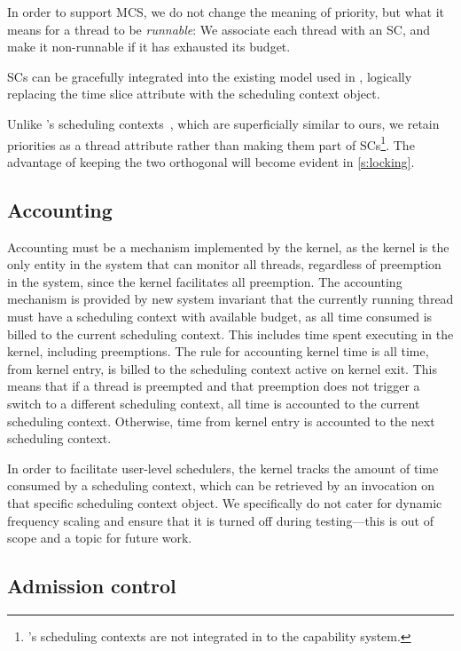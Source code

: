 In order to support MCS, we do not
change the meaning of priority, but what it means for a thread to be
\emph{runnable}: We associate each thread with an SC, and
make it non-runnable if it has exhausted its budget. 


\glspl{SC} can be gracefully integrated into the 
existing model used in \selfour,
logically replacing the time slice attribute with the scheduling context object.

Unlike \fiascooc's scheduling contexts~\citep{Lackorzynski_WVH_12}, which
are superficially similar to ours, we retain priorities as a thread
attribute rather than making them part of \glspl{SC}\footnote{\fiascooc's scheduling
contexts are not integrated in to the capability system.}. The advantage of keeping the two
orthogonal will become evident in \cref{s:locking}.

\subsection{Accounting}
\label{sec:model-accounting}

Accounting must be a mechanism implemented by the kernel, as the kernel is the only entity in the system
that can monitor all threads, regardless of preemption in the system, since the kernel facilitates all
preemption.
The accounting mechanism is provided by new system invariant that the currently running thread 
must have a scheduling context with available budget, as all time consumed is billed to the
current scheduling context.
This includes time spent executing in the kernel, including preemptions.
The rule for accounting kernel time is all time, from kernel entry, is billed to the scheduling
context active on kernel exit. This means that if a thread is preempted and 
that preemption does not trigger a switch to a 
different scheduling context, all time is accounted to the current scheduling context. Otherwise, 
time from kernel entry is accounted to the next scheduling context.

In order to facilitate user-level schedulers, the kernel tracks the amount of time consumed by a
scheduling context, which can be retrieved by an invocation on that specific scheduling context
object.
We specifically do not cater for dynamic frequency scaling and ensure that it is turned off
during testing---this is out of scope and a topic for future work. 

\subsection{Admission control}
\label{sec:model-admission}

